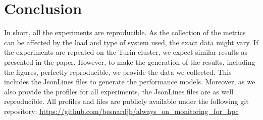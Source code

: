 \section{Conclusion}
In short, all the experiments are reproducible. As the collection of the metrics can be affected by the load 
and type of system used, the exact data might vary. If the experiments are repeated on the Turin cluster, 
we expect similar results as presented in the paper. However, to make the generation of the results, including 
the figures, perfectly reproducible, we provide the data we collected. 
This includes the JsonLines files to generate the performance models. Moreover, as we also provide the profiles for all experiments, 
the JsonLines files are as well reproducible. 
All profiles and files are publicly available under the following git repository: \url{https://github.com/besnardjb/always_on_monitoring_for_hpc}